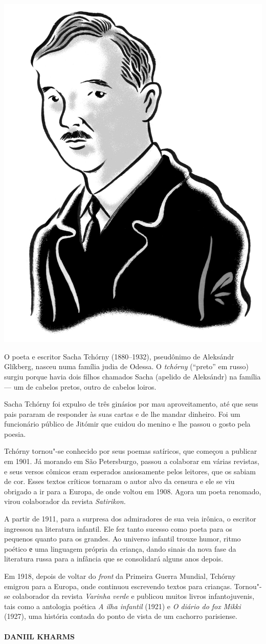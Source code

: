 \noindent\includegraphics[width=.8in]{./imgs/autor11.jpg}

\noindent{}O poeta e escritor Sacha Tchórny (1880--1932), pseudônimo de Aleksándr
Glíkberg, nasceu numa família judia de Odessa. O \emph{tchórny}
(``preto'' em russo) surgiu porque havia dois filhos chamados Sacha
(apelido de Aleksándr) na família --- um de cabelos pretos, outro de
cabelos loiros.

Sacha Tchórny foi expulso de três ginásios por mau aproveitamento, até
que seus pais pararam de responder às suas cartas e de lhe mandar
dinheiro. Foi um funcionário público de Jitómir que cuidou do menino e
lhe passou o gosto pela poesia.

Tchórny tornou"-se conhecido por seus poemas satíricos, que começou a
publicar em 1901. Já morando em São Petersburgo, passou a colaborar em
várias revistas, e seus versos cômicos eram esperados ansiosamente pelos
leitores, que os sabiam de cor. Esses textos críticos tornaram o autor
alvo da censura e ele se viu obrigado a ir para a Europa, de onde voltou
em 1908. Agora um poeta renomado, virou colaborador da revista
\emph{Satirikon.}

A partir de 1911, para a surpresa dos admiradores de sua veia irônica, o
escritor ingressou na literatura infantil. Ele fez tanto sucesso como
poeta para os pequenos quanto para os grandes. Ao universo infantil
trouxe humor, ritmo poético е uma linguagem própria da criança, dando
sinais da nova fase da literatura russa para a infância que se
consolidará alguns anos depois.

Em 1918, depois de voltar do \emph{front} da Primeira Guerra Mundial,
Tchórny emigrou para a Europa, onde continuou escrevendo textos para
crianças. Tornou"-se colaborador da revista \emph{Varinha verde} e
publicou muitos livros infantojuvenis, tais como a antologia poética
\emph{A ilha infantil} (1921) e \emph{O diário do fox Mikki}
(1927), uma história contada do ponto de vista de um cachorro
parisiense.

\paragraph{DANIIL KHARMS}

